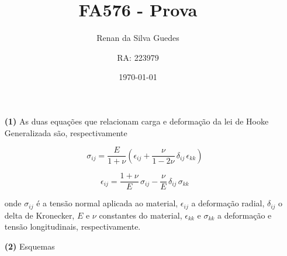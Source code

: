 \documentclass[a4paper, 12pt, brazilian]{article}
\title{FA576 - Prova}
\author{Renan da Silva Guedes \and RA: 223979}
\date{\today}
\begin{document}
	\maketitle
	\begin{itemize}
		\item[\textbf{(1)}] As duas equações que relacionam carga e deformação da lei de Hooke Generalizada são, respectivamente
		
		\begin{equation}
			\sigma_{ij}=\dfrac{E}{1+\nu}\left(\epsilon_{ij}+\dfrac{\nu}{1-2\nu}\,\delta_{ij}\,\epsilon_{kk}\right)
		\end{equation}
		
		\begin{equation}
			\epsilon_{ij}=\dfrac{1+\nu}{E}\,\sigma_{ij}-\dfrac{\nu}{E}\,\delta_{ij}\,\sigma_{kk}
		\end{equation}
		
		onde $\sigma_{ij}$ é a tensão normal aplicada ao material, $\epsilon_{ij}$ a deformação radial, $\delta_{ij}$ o delta de Kronecker, $E$ e $\nu$ constantes do material, $\epsilon_{kk}$ e $\sigma_{kk}$ a deformação e tensão longitudinais, respectivamente. 
		
		\item[\textbf{(2)}] Esquemas
		

\end{itemize}
\end{document}
